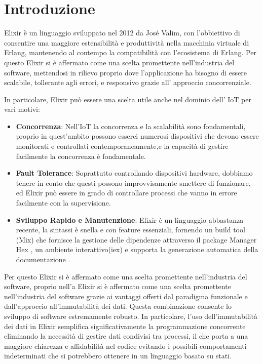 \chapter{Introduzione}

Elixir è un linguaggio sviluppato nel 2012 da José Valim,
con l'obbiettivo di consentire una maggiore estensibilità
e produttività nella macchinia virtuale di Erlang,
mantenendo al contempo la compatibilità con l'ecosistema
di Erlang\cite{Elixirpr12:online}.
Per questo Elixir si è affermato come una scelta promettente
nell'industria del software, mettendosi in rilievo proprio
dove l'applicazione ha bisogno di essere scalabile, tollerante
agli errori, e responsivo grazie all' approccio concorrenziale.

In particolare, Elixir può essere una scelta utile anche nel
dominio dell' IoT per vari motivi: 
\begin{itemize}
	\item \textbf{Concorrenza}: Nell'IoT la concorrenza
	e la scalabilità sono fondamentali, proprio in quest'ambito
	possono esserci numerosi dispositivi che devono essere monitorati
	e controllati contemporaneamente,e la capacità di gestire
	facilmente la concorrenza è fondamentale.
	\item \textbf{Fault Tolerance}: Soprattutto controllando
	dispositivi hardware, dobbiamo tenere in conto che questi
	possono improvvisamente smettere di funzionare, ed Elixir
	può essere in grado di controllare processi che vanno in
	errore facilmente con la supervisione. 
	\item \textbf{Sviluppo Rapido e Manutenzione}: Elixir è un linguaggio
	abbastanza recente, la sintassi è snella e con feature essenziali,
	fornendo un build tool (Mix) che fornisce la gestione delle dipendenze
	attraverso il package Manager Hex \cite{Hex63:online},
	un ambiente interattivo(iex) e supporta la generazione automatica della
	documentazione .
\end{itemize}


Per questo Elixir si è affermato come una scelta promettente
nell'industria del software, proprio nell'a
Elixir si è affermato come una scelta promettente
nell'industria del software grazie ai vantaggi offerti
dal paradigma funzionale e dall'approccio 
all'immutabilità dei dati.
Questa combinazione consente lo sviluppo di software
estremamente robusto. 
In particolare, l'uso dell'immutabilità dei dati in 
Elixir semplifica significativamente la programmazione
concorrente eliminando la necessità di gestire dati
condivisi tra processi, il che porta a una maggiore
chiarezza e affidabilità nel codice evitando i possibili
comportamenti indeterminati che si potrebbero ottenere
in un linguaggio basato su stati.


